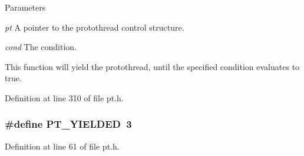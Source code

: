 \begin{DoxyParams}{Parameters}
\item[{\em pt}]A pointer to the protothread control structure. \item[{\em cond}]The condition.\end{DoxyParams}
This function will yield the protothread, until the specified condition evaluates to true. 

Definition at line 310 of file pt.h.

\hypertarget{group__pt_gae469332907e0617d72d5e2dd4297119d}{
\subsubsection[{PT\_\-YIELDED}]{\setlength{\rightskip}{0pt plus 5cm}\#define PT\_\-YIELDED~3}}
\label{group__pt_gae469332907e0617d72d5e2dd4297119d}


Definition at line 61 of file pt.h.


